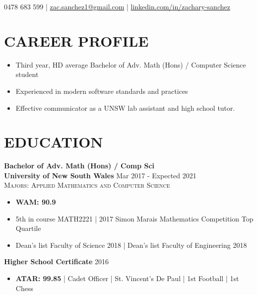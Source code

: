 \documentclass[a4paper,11pt]{article} %
\begin{document}
\pagestyle{empty} %



\par{ %

\begin{center}
	0478 683 599 | \href{mailto:zac.sanchez1@gmail.com}{zac.sanchez1@gmail.com} | \url{linkedin.com/in/zachary-sanchez}
\end{center}

\section{CAREER PROFILE}

\begin{itemize}[wide]
	\item Third year, HD average Bachelor of Adv. Math (Hons) / Computer Science student
	\item Experienced in modern software standards and practices 
	\item Effective communicator as a UNSW lab assistant and high school tutor. 
\end{itemize}

\section{EDUCATION}

{\raggedright
\textbf{Bachelor of Adv. Math (Hons) / Comp Sci} \\
\textbf{University of New South Wales} \hfill Mar 2017 - Expected 2021 \\
\textsc{Majors: Applied Mathematics and Computer Science} \\
}
\begin{itemize}[wide]
\item \textbf{WAM: 90.9}
\item 5th in course MATH2221 | 2017 Simon Marais Mathematics Competition Top Quartile
\item Dean's list Faculty of Science 2018 | Dean's list Faculty of Engineering 2018
\end{itemize}
{\raggedright
\textbf{Higher School Certificate} \hfill 2016
}
\begin{itemize}[wide]
	\item \textbf{ATAR: 99.85} | Cadet Officer | St. Vincent's De Paul  | 1st Football | 1st Chess
\end{itemize}

}
\end{document}
